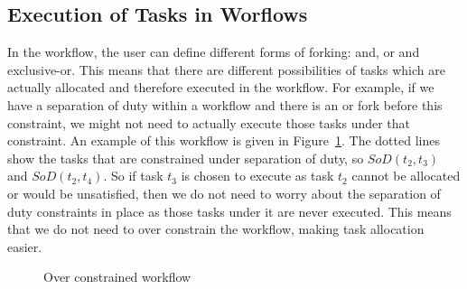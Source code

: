 \documentclass[a4paper]{report}
\begin{document}
\subsection{Execution of Tasks in Worflows}
In the workflow, the user can define different forms of forking: and, or and exclusive-or. This means that there are different possibilities of tasks which are actually allocated and therefore executed in the workflow. For example, if we have a separation of duty within a workflow and there is an or fork before this constraint, we might not need to actually execute those tasks under that constraint. An example of this workflow is given in Figure~\ref{fig:Over constrained workflow}. The dotted lines show the tasks that are constrained under separation of duty, so $SoD(t_2, t_3)$ and $SoD(t_2, t_4)$. So if task $t_3$ is chosen to execute as task $t_2$ cannot be allocated or would be unsatisfied, then we do not need to worry about the separation of duty constraints in place as those tasks under it are never executed. This means that we do not need to over constrain the workflow, making task allocation easier.
\begin{figure}[!htb]
\centering
{}
\caption{Over constrained workflow}
\label{fig:Over constrained workflow}
\end{figure}
\end{document}
